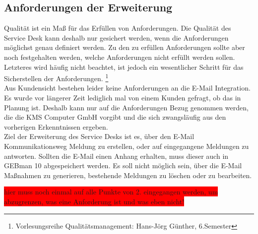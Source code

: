\subsection{Anforderungen der Erweiterung}

\noindent
Qualität ist ein Maß für das Erfüllen von Anforderungen. Die Qualität des Service Desk kann deshalb nur gesichert werden, wenn die Anforderungen möglichst genau definiert werden. Zu den zu erfüllen Anforderungen sollte aber noch festgehalten werden, welche Anforderungen nicht erfüllt werden sollen. Letzteres wird häufig nicht beachtet, ist jedoch ein wesentlicher Schritt für das Sicherstellen der Anforderungen. \footnote{Vorlesungsreihe Qualitätsmanagement: Hans-Jörg Günther, 6.Semester}\\

\noindent
Aus Kundensicht bestehen leider keine Anforderungen an die E-Mail Integration. Es wurde vor längerer Zeit lediglich mal von einem Kunden gefragt, ob das in Planung ist. Deshalb kann nur auf die Anforderungen Bezug genommen werden, die die KMS Computer GmbH vorgibt und die sich zwangsläufig aus den vorherigen Erkenntnissen ergeben.\\

\noindent
Ziel der Erweiterung des Service Desks ist es, über den E-Mail Kommunikationsweg Meldung zu erstellen, oder auf eingegangene Meldungen zu antworten. Sollten die E-Mail einen Anhang erhalten, muss dieser auch in GEBman 10 abgespeichert werden.\newline
Es soll nicht möglich sein, über die E-Mail Maßnahmen zu generieren, bestehende Meldungen zu löschen oder zu bearbeiten. 


\colorbox{red}{hier muss noch einmal auf alle Punkte von 2. eingegangen werden, um abzugrenzen, was eine Anforderung ist und was eben nicht! }
